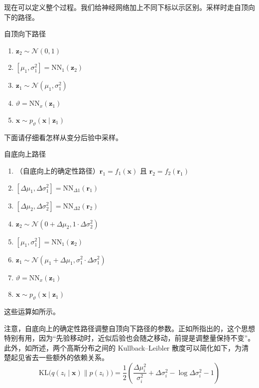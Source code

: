 现在可以定义整个过程。我们给神经网络加上不同下标以示区别。采样时走自顶向下的路径。
\begin{booknote}[colframe=blue!70!black,colback=blue!5]{自顶向下路径}
\begin{enumerate}
\item $\mathbf{z}_2\sim\mathcal{N}(0,1)$
\item $[\mu_1,\sigma_1^2]=\mathrm{NN}_1(\mathbf{z}_2)$
\item $\mathbf{z}_1\sim\mathcal{N}(\mu_1,\sigma_1^2)$
\item $\vartheta=\mathrm{NN}_x(\mathbf{z}_1)$
\item $\mathbf{x}\sim p_\vartheta(\mathbf{x}\mid\mathbf{z}_1)$
\end{enumerate}
\end{booknote}
下面请仔细看怎样从变分后验中采样。
\begin{booknote}[colframe=blue!70!black,colback=blue!5]{自底向上路径}
\begin{enumerate}
\item （自底向上的确定性路径）$\mathbf{r}_1=f_1(\mathbf{x})$ 且 $\mathbf{r}_2=f_2(\mathbf{r}_1)$
\item $[\Delta\mu_1,\Delta\sigma_1^2]=\mathrm{NN}_{\Delta 1}(\mathbf{r}_1)$
\item $[\Delta\mu_2,\Delta\sigma_2^2]=\mathrm{NN}_{\Delta 2}(\mathbf{r}_2)$
\item $\mathbf{z}_2\sim\mathcal{N}(0+\Delta\mu_2,1\cdot\Delta\sigma_2^2)$
\item $[\mu_1,\sigma_1^2]=\mathrm{NN}_1(\mathbf{z}_2)$
\item $\mathbf{z}_1\sim\mathcal{N}(\mu_1+\Delta\mu_1,\sigma_1^2\cdot\Delta\sigma_1^2)$
\item $\vartheta=\mathrm{NN}_x(\mathbf{z}_1)$
\item $\mathbf{x}\sim p_\vartheta(\mathbf{x}\mid\mathbf{z}_1)$
\end{enumerate}
\end{booknote}
这些运算如所示。

注意，自底向上的确定性路径调整自顶向下路径的参数。正如所指出的，这个思想特别有用，因为“先验移动时，近似后验也会随之移动，前提是调整量保持不变”。此外，如所述，两个高斯分布之间的 Kullback–Leibler 散度可以简化如下，为清楚起见省去一些额外的依赖关系。
\[
\mathrm{KL}\bigl(q(z_i\mid\mathbf{x})\|p(z_i)\bigr)
 =\frac12\left(\frac{\Delta\mu_i^2}{\sigma_i^2}+
       \Delta\sigma_i^2-\log\Delta\sigma_i^2-1\right)
\]


